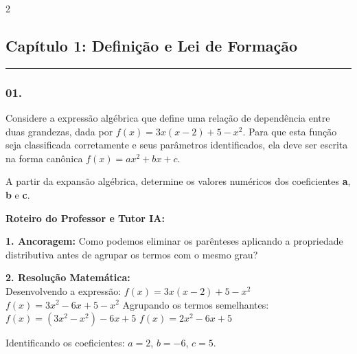 \par\vspace{0.3cm} 
\raggedcolumns
\begin{multicols*}{2}
\vspace{0.1cm}

\subsection*{Capítulo 1: Definição e Lei de Formação}
\vspace{-0.2cm}\noindent\rule{\linewidth}{1.5pt} 
\par\vspace{\espacoPosTitulo}
\subsubsection*{01.} 
\begin{enunciadoLiteral}
Considere a expressão algébrica que define uma relação de dependência entre duas grandezas, dada por $f(x) = 3x(x - 2) + 5 - x^2$. Para que esta função seja classificada corretamente e seus parâmetros identificados, ela deve ser escrita na forma canônica $f(x) = ax^2 + bx + c$.

A partir da expansão algébrica, determine os valores numéricos dos coeficientes \textbf{a}, \textbf{b} e \textbf{c}.
\end{enunciadoLiteral}

\ifgabarito
    \begin{tcolorbox}[colback=CorTitUm!5, colframe=CorTitUm, boxrule=1pt, arc=4pt, left=6pt, right=6pt, top=6pt, bottom=6pt]
    \small\textbf{\textcolor{CorTitUm}{Roteiro do Professor e Tutor IA:}}\par\vspace{0.1cm}
    \color{CinzaEscuro}
    \textbf{1. Ancoragem:} Como podemos eliminar os parênteses aplicando a propriedade distributiva antes de agrupar os termos com o mesmo grau?\par\vspace{0.1cm}
    \textbf{2. Resolução Matemática:}\\
    Desenvolvendo a expressão:
    $f(x) = 3x(x - 2) + 5 - x^2$
    $f(x) = 3x^2 - 6x + 5 - x^2$
    Agrupando os termos semelhantes:
    $f(x) = (3x^2 - x^2) - 6x + 5$
    $f(x) = 2x^2 - 6x + 5$
    
    Identificando os coeficientes: $a = 2$, $b = -6$, $c = 5$.
    \end{tcolorbox}
    \vspace{0.15cm}
    

\end{multicols*}
